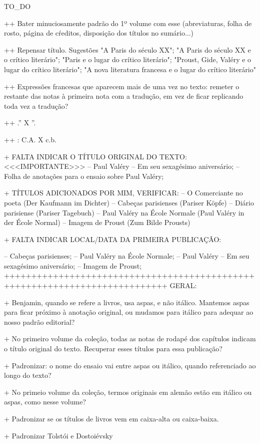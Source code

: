 TO_DO

++ Bater minuciosamente padrão do 1º volume com esse (abreviaturas, folha de rosto, página de cŕeditos, disposição dos títulos no sumário...)

++ Repensar título. Sugestões "A Paris do século XX"; "A Paris do século XX e o crítico literário"; "Paris e o lugar do crítico literário"; "Proust, Gide, Valéry e o lugar do crítico literário"; "A nova literatura francesa e o lugar do crítico literário"

++ Expressões francesas que aparecem mais de uma vez no texto: remeter o restante das notas à primeira nota com a tradução, em vez de ficar replicando toda vez a tradução?

++ .'' X ''.

++ : C.A. X c.b.

+ FALTA INDICAR O TÍTULO ORIGINAL DO TEXTO: <<<IMPORTANTE>>>
-- Paul Valéry – Em seu sexagésimo aniversário;
-- Folha de anotações para o ensaio sobre Paul Valéry;

+ TÍTULOS ADICIONADOS POR MIM, VERIFICAR:
-- O Comerciante no poeta (Der Kaufmann im Dichter)
-- Cabeças parisienses (Pariser Köpfe)
-- Diário parisiense (Pariser Tagebuch)
-- Paul Valéry na École Normale (Paul Valéry in der École Normal)
-- Imagem de Proust (Zum Bilde Prousts)


+ FALTA INDICAR LOCAL/DATA DA PRIMEIRA PUBLICAÇÃO:

-- Cabeças parisienses; 
-- Paul Valéry na École Normale;
-- Paul Valéry – Em seu sexagésimo aniversário;
-- Imagem de Proust; 
++++++++++++++++++++++++++++++++++++++++++++++++++++++++++++++++++++++++++++
GERAL:

+ Benjamin, quando se refere a livros, usa aspas, e não itálico. Mantemos aspas para ficar próximo à anotação original, ou mudamos para itálico para adequar ao nosso padrão editorial?

+ No primeiro volume da coleção, todas as notas de rodapé dos capítulos indicam o título original do texto. Recuperar esses títulos para essa publicação?

+ Padronizar: o nome do ensaio vai entre aspas ou itálico, quando referenciado ao longo do texto?

+ No primeio volume da coleção, termos originais em alemão estão em itálico ou aspas, como nesse volume?

+ Padronizar se os títulos de livros vem em caixa-alta ou caixa-baixa.

+ Padronizar Tolstói e Dostoiévsky

